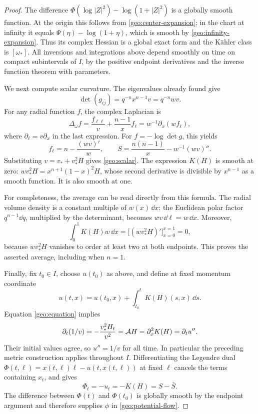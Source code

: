 \begin{proof}
The difference
\(\Phi(\log|Z|^2)-\log(1+|Z|^2)\) is a globally smooth function.
At the origin this follows from \eqref{geo:center-expansion}; in the
chart at infinity it equals
\(\Psi(\eta)-\log(1+\eta)\), which is smooth by
\eqref{geo:infinity-expansion}.  Thus its complex Hessian is a global
exact form and the K\"ahler class is \([\omega_*]\).  All inversions and
integrations above depend smoothly on time on compact subintervals of
\(I\), by the positive endpoint derivatives and the inverse function
theorem with parameters.

We next compute scalar curvature.  The eigenvalues already found give
\[
 \det(g_{i\bar j})=q^{-n}x^{n-1}v=q^{-n}wv.
\]
For any radial function \(f\), the complex Laplacian is
\begin{equation}\label{geo:complex-laplacian}
 \Delta_\omega f
 =\frac{f_{\ell\ell}}{v}+\frac{n-1}{x}f_\ell
 =w^{-1}\partial_x(wf_\ell),
\end{equation}
where \(\partial_\ell=v\partial_x\) in the last expression.
For \(f=-\log\det g\), this yields
\[
 f_\ell=n-\frac{(wv)'}w,\qquad
 S=\frac{n(n-1)}x-w^{-1}(wv)''.
\]
Substituting \(v=v_*+v_*^2H\) gives
\eqref{geo:scalar}.  The expression \(K(H)\) is smooth at zero:
\(wv_*^2H=x^{n+1}(1-x)^2H\), whose second derivative is divisible by
\(x^{n-1}\) as a smooth function.  It is also smooth at one.

For completeness, the average can be read directly from this formula.
The radial volume density is a constant multiple of \(w(x)\,\dd x\):
the Euclidean polar factor \(q^{n-1}\dd q\), multiplied by the
determinant, becomes \(wv\,\dd\ell=w\,\dd x\).  Moreover,
\[
 \int_0^1 K(H)w\,\dd x
 =\big[(wv_*^2H)'\big]_{x=0}^{x=1}=0,
\]
because \(wv_*^2H\) vanishes to order at least two at both endpoints.
This proves the asserted average, including when \(n=1\).

Finally, fix \(t_0\in I\), choose \(u(t_0)\) as above, and define at
fixed momentum coordinate
\begin{equation}\label{geo:legendre-flow}
 u(t,x)=u(t_0,x)+\int_{t_0}^{t}K(H)(s,x)\,\dd s.
\end{equation}
Equation \eqref{geo:equation} implies
\[
 \partial_t(1/v)=-\frac{v_*^2H_t}{v^2}
 =\mathcal A H=\partial_x^2K(H)=\partial_tu''.
\]
Their initial values agree, so \(u''=1/v\) for all time.  In
particular the preceding metric construction applies throughout \(I\).
Differentiating the Legendre dual
\(\Phi(t,\ell)=x(t,\ell)\ell-u(t,x(t,\ell))\) at fixed \(\ell\)
cancels the terms containing \(x_t\), and gives
\begin{equation}\label{geo:legendre-sign}
 \Phi_t=-u_t=-K(H)=S-\bar S.
\end{equation}
The difference between \(\Phi(t)\) and \(\Phi(t_0)\) is globally smooth
by the endpoint argument and therefore supplies \(\phi\) in
\eqref{geo:potential-flow}.


\end{proof}
